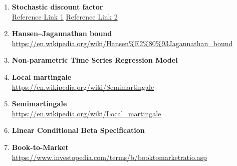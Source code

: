 \begin{enumerate}
        \item\textbf{Stochastic discount factor}\\
        \href{https://en.wikipedia.org/wiki/Stochastic_discount_factor}{Reference Link 1}
        \href{https://www.youtube.com/watch?v=kHSNu6sfrfM}{Reference Link 2}
         
        \item\textbf{Hansen–Jagannathan bound}
        \url{https://en.wikipedia.org/wiki/Hansen%E2%80%93Jagannathan_bound}
        
        \item\textbf{Non-parametric Time Series Regression Model}
        
        \item\textbf{Local martingale} \\ 
        \url{https://en.wikipedia.org/wiki/Semimartingale}
        
        \item\textbf{Semimartingale} \\
        \url{https://en.wikipedia.org/wiki/Local_martingale}
        
        \item\textbf{Linear Conditional Beta Specification}
        \url{}
        
        \item\textbf{Book-to-Market}\\
        \url{https://www.investopedia.com/terms/b/booktomarketratio.asp}




\end{enumerate}

     